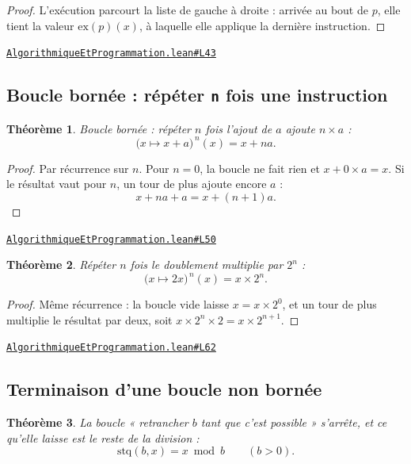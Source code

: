 \documentclass[11pt,a4paper]{article}
\theoremstyle{definition}
\theoremstyle{plain}
\newtheorem{theoreme}{Théorème}
\newcommand{\source}[2]{\par\smallskip\noindent\hfill{\footnotesize\href{#1}{\texttt{#2}}}\par\smallskip}
\begin{document}
\begin{proof}
L'exécution parcourt la liste de gauche à droite : arrivée au bout de $p$, elle tient la
valeur $\mathrm{ex}(p)(x)$, à laquelle elle applique la dernière instruction.
\end{proof}
\source{https://github.com/Commutator-IO/learn-lean/blob/main/cours/01-college/07-algorithmique-et-programmation/AlgorithmiqueEtProgrammation.lean\#L43}{AlgorithmiqueEtProgrammation.lean\#L43}

\subsection{Boucle bornée : répéter \texttt{n} fois une instruction}

\begin{theoreme}
Boucle bornée : répéter $n$ fois l'ajout de $a$ ajoute $n \times a$ :
\[ \bigl(x \mapsto x + a\bigr)^{\,n}(x) = x + na . \]
\end{theoreme}

\begin{proof}
Par récurrence sur $n$. Pour $n = 0$, la boucle ne fait rien et $x + 0 \times a = x$.
Si le résultat vaut pour $n$, un tour de plus ajoute encore $a$ :
\[ x + na + a = x + (n+1)a . \]
\end{proof}
\source{https://github.com/Commutator-IO/learn-lean/blob/main/cours/01-college/07-algorithmique-et-programmation/AlgorithmiqueEtProgrammation.lean\#L50}{AlgorithmiqueEtProgrammation.lean\#L50}

\begin{theoreme}
Répéter $n$ fois le doublement multiplie par $2^n$ :
\[ \bigl(x \mapsto 2x\bigr)^{\,n}(x) = x \times 2^n . \]
\end{theoreme}

\begin{proof}
Même récurrence : la boucle vide laisse $x = x \times 2^0$, et un tour de plus multiplie
le résultat par deux, soit $x \times 2^n \times 2 = x \times 2^{n+1}$.
\end{proof}
\source{https://github.com/Commutator-IO/learn-lean/blob/main/cours/01-college/07-algorithmique-et-programmation/AlgorithmiqueEtProgrammation.lean\#L62}{AlgorithmiqueEtProgrammation.lean\#L62}

\subsection{Terminaison d'une boucle non bornée}

\begin{theoreme}
La boucle « retrancher $b$ tant que c'est possible » s'arrête, et ce qu'elle
laisse est le reste de la division :
\[ \mathrm{stq}(b, x) = x \bmod b \qquad (b > 0) . \]
\end{theoreme}
\end{document}

